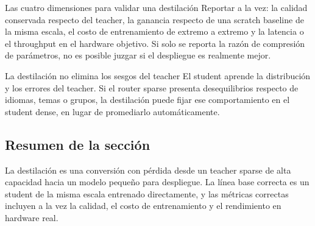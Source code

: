 
\begin{importantbox}{Las cuatro dimensiones para validar una destilación}
Reportar a la vez: la calidad conservada respecto del teacher, la ganancia respecto de una scratch baseline de la misma escala, el costo de entrenamiento de extremo a extremo y la latencia o el throughput en el hardware objetivo. Si solo se reporta la razón de compresión de parámetros, no es posible juzgar si el despliegue es realmente mejor.
\end{importantbox}

\begin{warningbox}{La destilación no elimina los sesgos del teacher}
El student aprende la distribución y los errores del teacher. Si el router sparse presenta desequilibrios respecto de idiomas, temas o grupos, la destilación puede fijar ese comportamiento en el student dense, en lugar de promediarlo automáticamente.
\end{warningbox}

\subsection{Resumen de la sección}

La destilación es una conversión con pérdida desde un teacher sparse de alta capacidad hacia un modelo pequeño para despliegue. La línea base correcta es un student de la misma escala entrenado directamente, y las métricas correctas incluyen a la vez la calidad, el costo de entrenamiento y el rendimiento en hardware real.
